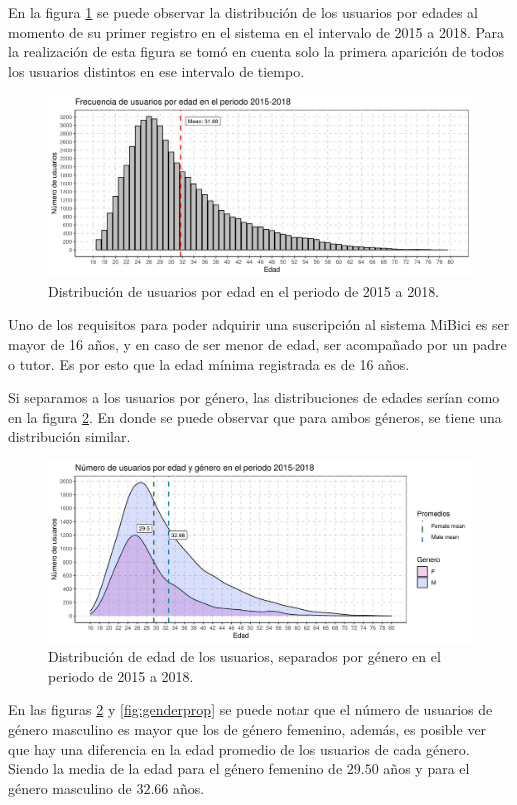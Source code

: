 En la figura \ref{fig:agedistribution} se puede observar la distribución de los usuarios por edades al momento de su primer registro en el sistema en el intervalo de 2015 a 2018. Para la realización de esta figura se tomó en cuenta solo la primera aparición de todos los usuarios distintos en ese intervalo de tiempo.

\begin{figure}[H]
	\centering
	\includegraphics[width=14cm]{Graphics/age_distribution}
	\caption{Distribución de usuarios por edad en el periodo de 2015 a 2018.}
	\label{fig:agedistribution}
\end{figure}

Uno de los requisitos para poder adquirir una suscripción al sistema MiBici es ser mayor de 16 años, y en caso de ser menor de edad, ser acompañado por un padre o tutor. Es por esto que la edad mínima registrada es de 16 años.
\par Si separamos a los usuarios por género, las distribuciones de edades serían como en la figura \ref{fig:agegenderdistribution}. En donde se puede observar que para ambos géneros, se tiene una distribución similar.

\begin{figure}[H]
	\centering
	\includegraphics[width=14cm]{Graphics/age_gender_distribution}
	\caption{Distribución de edad de los usuarios, separados por género en el periodo de 2015 a 2018.}
	\label{fig:agegenderdistribution}
\end{figure}

En las figuras \ref{fig:agegenderdistribution} y \ref{fig:genderprop} se puede notar que el número de usuarios de género masculino es mayor que los de género femenino, además, es posible ver que hay una diferencia en la edad promedio de los usuarios de cada género. Siendo la media de la edad para el género femenino de $29.50$ años y para el género masculino de $32.66$ años.